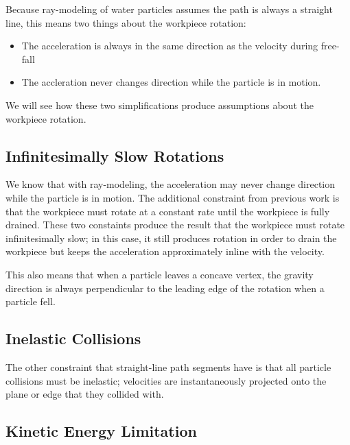 Because ray-modeling of water particles assumes the path is always a straight line, this means two things about the workpiece rotation:

\begin{itemize}
	\item The acceleration is always in the same direction as the velocity during free-fall
	\item The accleration never changes direction while the particle is in motion.
\end{itemize}

We will see how these two simplifications produce assumptions about the workpiece rotation.

	\subsection{Infinitesimally Slow Rotations}

We know that with ray-modeling, the acceleration may never change direction while the particle is in motion. The additional constraint from previous work is that the workpiece must rotate at a constant rate until the workpiece is fully drained. These two constaints produce the result that the workpiece must rotate infinitesimally slow; in this case, it still produces rotation in order to drain the workpiece but keeps the acceleration approximately inline with the velocity.

This also means that when a particle leaves a concave vertex, the gravity direction is always perpendicular to the leading edge of the rotation when a particle fell.


	\subsection{Inelastic Collisions}

The other constraint that straight-line path segments have is that all particle collisions must be inelastic; velocities are instantaneously projected onto the plane or edge that they collided with.


	\subsection{Kinetic Energy Limitation}

